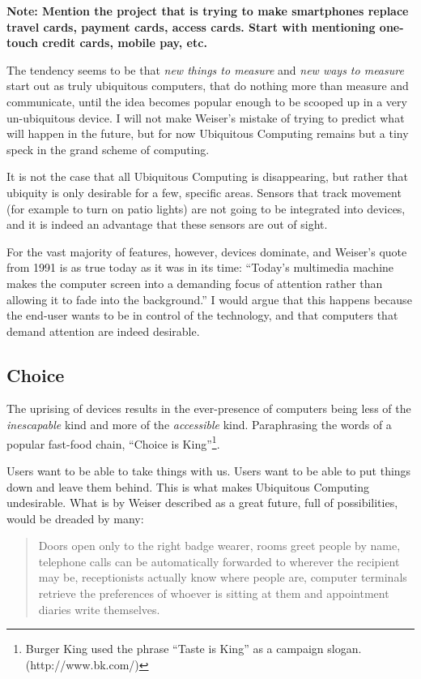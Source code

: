 \textbf{Note: Mention the project that is trying to make smartphones replace travel cards, payment cards, access cards. Start with mentioning
one-touch credit cards, mobile pay, etc.}

The tendency seems to be that \emph{new things to measure} and \emph{new ways to measure} start out as truly ubiquitous computers, that do
nothing more than measure and communicate, until the idea becomes popular enough to be scooped up in a very un-ubiquitous device. I will
not make Weiser's mistake of trying to predict what will happen in the future, but for now Ubiquitous Computing remains but a tiny speck in the
grand scheme of computing.

It is not the case that all Ubiquitous Computing is disappearing, but rather
that ubiquity is only desirable for a few, specific areas. Sensors that track movement (for example to turn on patio lights) are not going to be integrated
into devices, and it is indeed an advantage that these sensors are out of sight.

For the vast majority of features, however, devices dominate, and Weiser's quote from 1991 is as true today as it was in its
time: ``Today's multimedia machine makes the computer screen into a demanding focus of attention rather than allowing it to fade into the
background.''\cite{weiser91} I would argue that this happens because the end-user wants to be in control of the technology, and that
computers that demand attention are indeed desirable.

\subsection*{Choice}

The uprising of devices results in the ever-presence of computers being less of the \emph{inescapable} kind and more of the \emph{accessible}
kind. Paraphrasing the words of a popular fast-food chain, ``Choice is King''\footnote{Burger King used the phrase ``Taste is King'' as a campaign slogan. (http://www.bk.com/)}.

Users want to be able to take things with us. Users want to be able to put things down and leave them behind. This is what makes Ubiquitous Computing undesirable.
What is by Weiser described as a great future, full of possibilities, would be dreaded by many:

\begin{quote}
    Doors open only to the right badge wearer, rooms greet people by name, telephone calls can be automatically forwarded to
    wherever the recipient may be, receptionists actually know where people are, computer terminals retrieve the preferences
    of whoever is sitting at them and appointment diaries write themselves.\cite{weiser91}
\end{quote}

